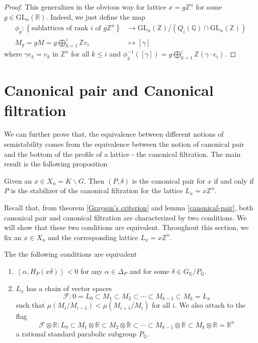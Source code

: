\begin{proof}
    This generalizes in the obvious way for lattice $x = g\mathbb{Z}^n$ for some $g \in \text{GL}_n(\mathbb{R})$. Indeed, we just define
    the map
    \begin{align*}
        \phi_g \colon \left\lbrace\text{sublattices of rank $i$ of $g\mathbb{Z}^n$}\right\rbrace & \to \text{GL}_n(\mathbb{Z})/(Q_i(\mathbb{Q}) \cap \text{GL}_n(\mathbb{Z})) \\
        M_g = gM = g \bigoplus_{k=1}^i  \mathbb{Z}v_i                                            & \mapsto [\gamma]
    \end{align*}
    where $\gamma e_k = v_k$ in $\mathbb{Z}^n$ for all $ k \le i$ and $\phi_g^{-1}([\gamma]) = g \bigoplus_{k=1}^i  \mathbb{Z}(\gamma \cdot e_i)$.
\end{proof}
\section{Canonical pair and Canonical filtration}
We can further prove that, the equivalence between different notions of semistability
comes from the equivalence between the notion of canonical pair and the bottom of the
profile of a lattice - the canonical filtration. The main result is the following proposition
\begin{prop}
    Given an $x \in X_n = K\backslash G$. Then $(P,\delta)$ is the canonical pair for $x$ if and only if $P$
    is the stabilizer of the canonical filtration for the lattice $L_x = x\mathbb{Z}^n$.
\end{prop}
Recall that, from theorem \ref{Grayson's criterion} and lemma \ref{canonical-pair}, both canonical
pair and canonical filtration are characterized by two conditions. We will show that these two conditions are equivalent.
Throughout this section, we fix an $x \in X_n$ and the corresponding lattice $L_x= x\mathbb{Z}^n$.
\begin{lemma}\label{increasing-slope}
    The the following conditions are equivalent
    \begin{enumerate}
        \item  $\left\langle \alpha, H_P(x\delta)\right\rangle <0$ for any $\alpha \in \Delta_P$ and for some $\delta \in G_\mathbb{Q}/P_\mathbb{Q}$.
        \item $L_x$ has a chain of vector spaces
              \[\mathcal{F}: 0 = L_0 \subset M_1 \subset M_2 \subset \cdots \subset M_{k-1} \subset M_k = L_x \]
              such that $\mu(M_i/M_{i-1}) <\mu(M_{i+1}/M_i)$ for all $i$. We also attach to the flag
              \[\mathcal{F}\otimes \mathbb{R} \colon L_0 \subset M_1 \otimes \mathbb{R} \subset M_2\otimes \mathbb{R} \subset \cdots \subset M_{k-1}\otimes \mathbb{R} \subset M_k\otimes \mathbb{R} =  \mathbb{R}^n \]
              a rational standard parabolic subgroup $P_\mathbb{Q}$.
    \end{enumerate}
\end{lemma}
